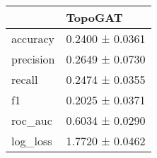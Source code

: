 \begin{tabular}{ll}
\toprule
 & TopoGAT \\
\midrule
accuracy & 0.2400 ± 0.0361 \\
precision & 0.2649 ± 0.0730 \\
recall & 0.2474 ± 0.0355 \\
f1 & 0.2025 ± 0.0371 \\
roc_auc & 0.6034 ± 0.0290 \\
log_loss & 1.7720 ± 0.0462 \\
\bottomrule
\end{tabular}
